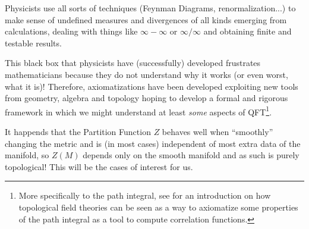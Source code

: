 Physicists use all sorts of techniques (Feynman Diagrams, renormalization...) to make sense of undefined measures and divergences of all kinds emerging from calculations, dealing with things like $\infty-\infty$ or $\infty/\infty$ and obtaining finite and testable results.

\noindent This black box that physicists have (successfully) developed frustrates mathematicians because they do not understand why it works (or even worst, what it is)!
Therefore, axiomatizations have been developed exploiting new tools from geometry, algebra and topology hoping to develop a formal and rigorous framework in which we might understand at least \textit{some} aspects of QFT\footnote{More specifically to the path integral, see \cite[2.1]{Carqueville_2018} for an introduction on how topological field theories can be seen as a way to axiomatize some properties of the path integral as a tool to compute correlation functions.}.

\noindent It happends that the Partition Function $Z$ behaves well when ``smoothly'' changing the metric and is (in most cases) independent of most extra data of the manifold, so $Z(M)$ depends only on the smooth manifold and as such is purely topological! This will be the cases of interest for us.

\bigskip

